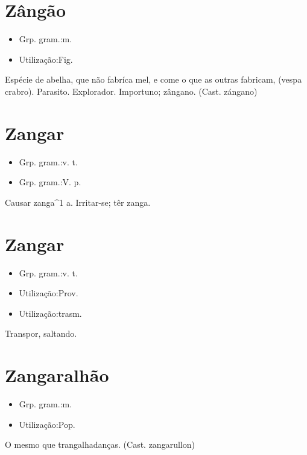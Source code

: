 \section{Zângão}
\begin{itemize}
\item {Grp. gram.:m.}
\end{itemize}
\begin{itemize}
\item {Utilização:Fig.}
\end{itemize}
Espécie de abelha, que não fabríca mel, e come o que as outras fabricam, (\textunderscore vespa crabro\textunderscore ).
Parasito.
Explorador.
Importuno; zângano.
(Cast. \textunderscore zángano\textunderscore )
\section{Zangar}
\begin{itemize}
\item {Grp. gram.:v. t.}
\end{itemize}
\begin{itemize}
\item {Grp. gram.:V. p.}
\end{itemize}
Causar zanga^1 a.
Irritar-se; têr zanga.
\section{Zangar}
\begin{itemize}
\item {Grp. gram.:v. t.}
\end{itemize}
\begin{itemize}
\item {Utilização:Prov.}
\end{itemize}
\begin{itemize}
\item {Utilização:trasm.}
\end{itemize}
Transpor, saltando.
\section{Zangaralhão}
\begin{itemize}
\item {Grp. gram.:m.}
\end{itemize}
\begin{itemize}
\item {Utilização:Pop.}
\end{itemize}
O mesmo que \textunderscore trangalhadanças\textunderscore .
(Cast. \textunderscore zangarullon\textunderscore )
